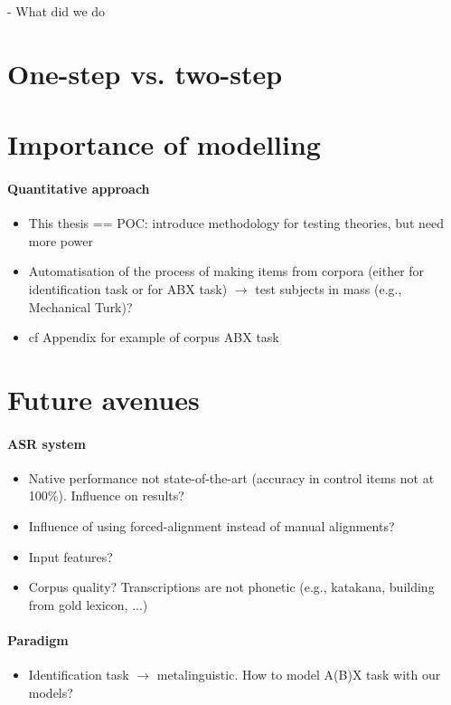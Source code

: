 
- What did we do

\section{One-step vs. two-step}


\section{Importance of modelling}

\paragraph{Quantitative approach}
 \begin{itemize}
   \item This thesis == POC: introduce methodology for testing theories, but need more power 
   \item Automatisation of the process of making items from corpora (either for identification task or for ABX task) $\rightarrow$ test subjects in mass (e.g., Mechanical Turk)? 
\item cf Appendix for example of corpus ABX task
  \end{itemize} 

\section{Future avenues}

\paragraph{ASR system}
\begin{itemize}
\item Native performance not state-of-the-art (accuracy in control items not at 100\%). Influence on results?
\item Influence of using forced-alignment instead of manual alignments?
\item Input features?
  \item Corpus quality? Transcriptions are not phonetic (e.g., katakana, building from gold lexicon, ...)
  \end{itemize}


\paragraph{Paradigm}
\begin{itemize}
  \item Identification task $\rightarrow$ metalinguistic. How to model A(B)X task with our models?
  \end{itemize}


